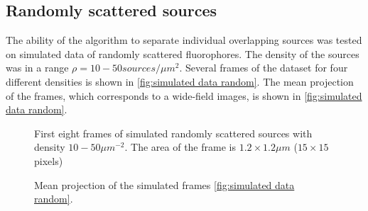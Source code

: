 \clearpage
\subsection{Randomly scattered sources\label{sub:Simul random}}
The ability of the algorithm to separate individual overlapping sources was tested on simulated data of randomly scattered fluorophores.     The density of the sources was in a range $\rho=10-50 \unit{sources/\mu m^{2}}$. Several frames of the dataset for four different densities is shown in  \autoref{fig:simulated data random}. The mean projection of the frames, which corresponds to a wide-field images, is shown in \autoref{fig:simulated data random}.

\begin{figure}[!htb]	
	\newcommand{\widthfig}{1\textwidth}
	\centering	
	
	
	\caption{First eight frames of simulated randomly scattered sources with density $10-50\unit{\mu m^{-2}}$. The area of the frame is $1.2\times1.2\unit{\mu m}$ ($15\times15$ pixels)}
	\label{fig:simulated data random}
\end{figure} 
%
\begin{figure}[!htb]	
	\newcommand{\widthfig}{.3\textwidth}
	\centering	
	\hspace{.3cm}	
	\hspace{.3cm}	
	\caption{Mean projection of the simulated frames \autoref{fig:simulated data random}.}
	\label{fig:simulated data random - mean}
\end{figure} 

\clearpage
